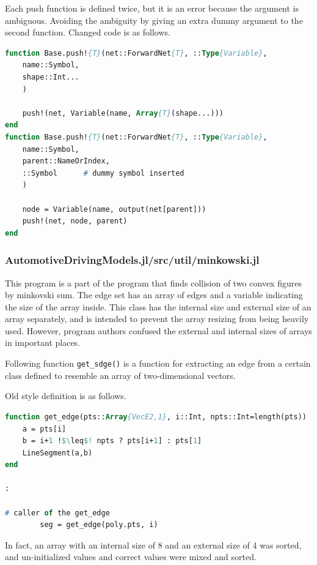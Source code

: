 Each push function is defined twice, but it is an error because the argument is ambiguous. Avoiding the ambiguity by giving an extra dummy argument to the second function.
Changed code is as follows.

\begin{lstlisting}[caption=Changed code 
,label=list:julia_06_forwardnets, language=Pascal, frame=single]
function Base.push!{T}(net::ForwardNet{T}, ::Type{Variable},
    name::Symbol,
    shape::Int...
    )

    push!(net, Variable(name, Array{T}(shape...)))
end
function Base.push!{T}(net::ForwardNet{T}, ::Type{Variable},
    name::Symbol,
    parent::NameOrIndex,
    ::Symbol      # dummy symbol inserted
    )

    node = Variable(name, output(net[parent]))
    push!(net, node, parent)
end
\end{lstlisting}

\subsubsection{AutomotiveDrivingModels.jl/src/util/minkowski.jl}

This program is a part of the program that finds collision of two convex figures by minkovski sum.
The edge set has an array of edges and a variable indicating the size of the array inside. 
This class has the internal size and external size of an array separately, and is intended to prevent the array resizing from being heavily used.
However, program authors confused the external and internal sizes of arrays in important places.

Following function {\tt get\_sdge()} is a function for extracting an edge from a certain class defined to resemble an array of two-dimensional vectors.

Old style definition is as follows.

\begin{lstlisting}[caption=Julia old style definition 
,label=list:julia_05_automotive, escapechar=!, language=Pascal, frame=single]
function get_edge(pts::Array{VecE2,1}, i::Int, npts::Int=length(pts))
    a = pts[i]
    b = i+1 !$\leq$! npts ? pts[i+1] : pts[1]
    LineSegment(a,b)
end

:

# caller of the get_edge
        seg = get_edge(poly.pts, i)

\end{lstlisting}

In fact, an array with an internal size of 8 and an external size of 4 was sorted, and un-initialized values and correct values were mixed and sorted.

